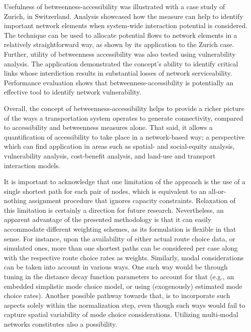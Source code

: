 \documentclass[]{elsarticle} %
\begin{document}
Usefulness of betweenness-accessibility was illustrated with a case
study of Zurich, in Switzerland. Analysis showcased how the measure can
help to identify important network elements when system-wide interaction
potential is considered. The technique can be used to allocate potential
flows to network elements in a relatively straightforward way, as shown
by its application to the Zurich case. Further, utility of betweenness
accessibility was also tested using vulnerability analysis. The
application demonstrated the concept's ability to identify critical
links whose interdiction results in substantial losses of network
serviceability. Performance evaluation shows that
betweenness-accessibility is potentially an effective tool to identify
network vulnerability.

Overall, the concept of betweenness-accessibility helps to provide a
richer picture of the ways a transportation system operates to generate
connectivity, compared to accessibility and betweenness measures alone.
That said, it allows a quantification of accessibility to take place in
a network-based way; a perspective which can find application in areas
such as spatial- and social-equity analysis, vulnerability analysis,
cost-benefit analysis, and land-use and transport interaction models.

It is important to acknowledge that one limitation of the approach is
the use of a single shortest path for each pair of nodes, which is
equivalent to an all-or-nothing assignment procedure that ignores
capacity constraints. Relaxation of this limitation is certainly a
direction for future research. Nevertheless, an apparent advantage of
the presented methodology is that it can easily accommodate different
weighting schemes, as its formulation is flexible in that sense. For
instance, upon the availability of either actual route choice data, or
simulated ones, more than one shortest paths can be considered per case
along with the respective route choice rates as weights. Similarly,
modal considerations can be taken into account in various ways. One such
way would be through tuning in the distance decay function parameters to
account for that (e.g., an embedded simplistic mode choice model, or
using (exogenously) estimated mode choice rates). Another possible
pathway towards that, is to incorporate such aspects solely within the
normalization step, even though such ways would fail to capture spatial
variability of mode choice considerations. Utilizing multi-modal
networks constitutes also a possibility.
\end{document}
